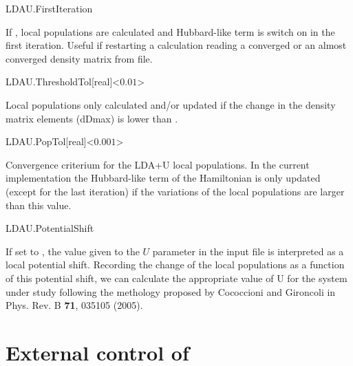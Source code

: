 \begin{fdflogicalF}{LDAU.FirstIteration}
  
  If \fdftrue, local populations are calculated and Hubbard-like term
  is switch on in the first iteration.  Useful if restarting a
  calculation reading a converged or an almost converged density
  matrix from file.

\end{fdflogicalF}

\begin{fdfentry}{LDAU.ThresholdTol}[real]<$0.01$>
  
  Local populations only calculated and/or updated if the change in the
  density matrix elements (dDmax) is lower than .

\end{fdfentry}

\begin{fdfentry}{LDAU.PopTol}[real]<$0.001$>
  
  Convergence criterium for the LDA+U local populations.  In the
  current implementation the Hubbard-like term of the Hamiltonian is
  only updated (except for the last iteration) if the variations of
  the local populations are larger than this value.

\end{fdfentry}

\begin{fdflogicalF}{LDAU.PotentialShift}

  If set to \fdftrue, the value given to the $U$ parameter in the
  input file is interpreted as a local potential shift. Recording the
  change of the local populations as a function of this potential
  shift, we can calculate the appropriate value of U for the system
  under study following the methology proposed by Cococcioni and
  Gironcoli in Phys. Rev. B \textbf{71}, 035105 (2005).

\end{fdflogicalF}



\section{External control of \texorpdfstring{\siesta}{SIESTA}}
\label{sec:lua}


